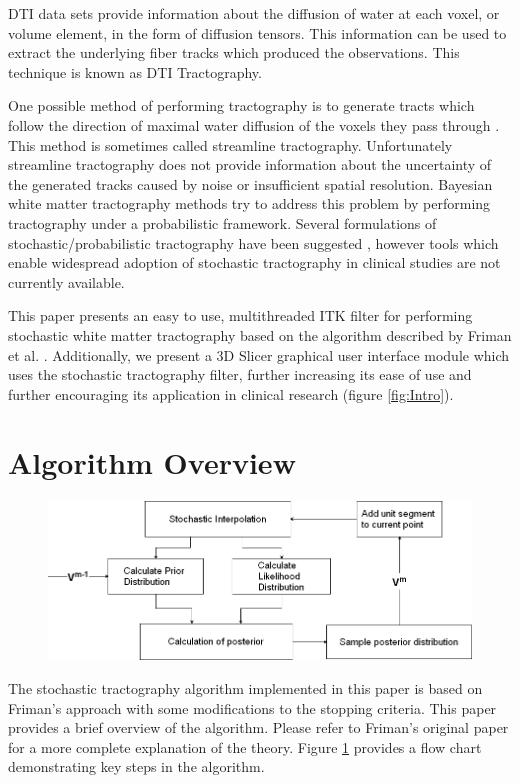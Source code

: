 \documentclass{InsightArticle}
\begin{document}
DTI data sets provide information about the diffusion of water at each voxel, or volume element, in the form of diffusion tensors.  This information can be used to extract the underlying fiber tracks which produced the observations.  This technique is known as DTI Tractography.

One possible method of performing tractography is to generate tracts which follow the direction of maximal water diffusion of the voxels they pass through \cite{Mori99, Basser00}.  This method is sometimes called streamline tractography.  Unfortunately streamline tractography does not provide information about the uncertainty of the generated tracks caused by noise or insufficient spatial resolution.  Bayesian white matter tractography methods try to address this problem by performing tractography under a probabilistic framework.  Several formulations of stochastic/probabilistic tractography have been suggested \cite{bjornemoMICCAI02,behrensMRM03,Tuch01,derek,Lazar05}, however tools which enable widespread adoption of stochastic tractography in clinical studies are not currently available.

This paper presents an easy to use, multithreaded ITK filter for performing stochastic white matter tractography based on the algorithm described by Friman et al. \cite{frimanMICCAI05, frimanTMI06}.  Additionally, we present a 3D Slicer \cite{3DSlicer} graphical user interface module which uses the stochastic tractography filter, further increasing its ease of use and further encouraging its application in clinical research (figure \ref{fig:Intro}).

\section{Algorithm Overview}

\begin{figure}
  \center
	\includegraphics[width=\linewidth]{stflowsmall}
	 \label{fig:stflow}
\end{figure}
The stochastic tractography algorithm implemented in this paper is based on Friman's \cite{frimanTMI06} approach with some modifications to the stopping criteria.  This paper provides a brief overview of the algorithm.  Please refer to Friman's \cite{frimanTMI06} original paper for a more complete explanation of the theory.  Figure \ref{fig:stflow} provides a flow chart demonstrating key steps in the algorithm.
\end{document}
